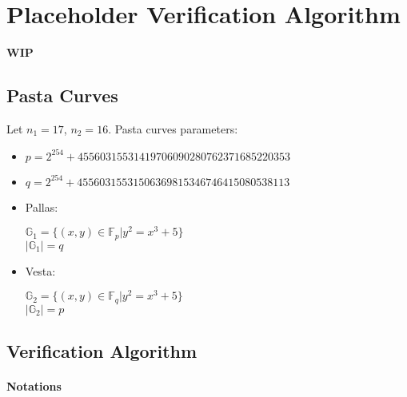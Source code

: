 \section{Placeholder Verification Algorithm}
\label{section:preliminaries}
\textbf{WIP}

\subsection{Pasta Curves}

Let $n_1 = 17$, $n_2 = 16$.
Pasta curves parameters:
\begin{itemize}
    \item $p = 2^{254} + 45560315531419706090280762371685220353$
    \item $q = 2^{254} + 45560315531506369815346746415080538113$
    \item Pallas:
    \begin{center}
        $\mathbb{G}_1 = \{ (x, y) \in \mathbb{F}_p | y^2 = x^3 + 5 \}$ \\
        $|\mathbb{G}_1| = q$
    \end{center}
    \item Vesta:
    \begin{center}
        $\mathbb{G}_2 = \{ (x, y) \in \mathbb{F}_q | y^2 = x^3 + 5 \}$ \\
        $|\mathbb{G}_2| = p$
    \end{center}
\end{itemize}

\subsection{Verification Algorithm}

\paragraph{Notations}

